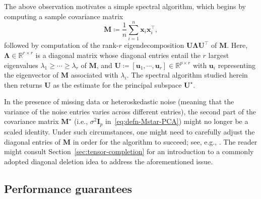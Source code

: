  The above observation motivates a simple spectral algorithm, which begins by computing a sample covariance matrix
%
\begin{equation}
	\bm{M} \coloneqq \frac{1}{n} \sum_{i=1}^{n}\bm{x}_{i}\bm{x}_{i}^{\top},
	\label{eq:defn-sample-covariance}
\end{equation}
%
followed by  computation of the rank-$r$ eigendecomposition $\bm{U}\bm{\Lambda}\bm{U}^{\top}$
of $\bm{M}$. Here, $\bm{\Lambda}\in\mathbb{R}^{r\times r}$ is a
diagonal matrix whose diagonal entries entail the $r$ largest eigenvalues $\lambda_{1}\geq\cdots\geq\lambda_{r}$
of $\bm{M}$, and $\bm{U}\coloneqq[\bm{u}_{1},\cdots,\bm{u}_{r}]\in\mathbb{R}^{p\times r}$
with $\bm{u}_{i}$ representing the eigenvector of $\bm{M}$ associated with $\lambda_{i}$.
The spectral algorithm studied herein then returns $\bm{U}$ as the  estimate for the principal subspace $\bm{U}^{\star}$.


\begin{remark}
	In the presence of missing data or heteroskedastic noise (meaning that the  variance of the noise entries varies across different entries),  the second part of the covariance matrix $\bm{M}^{\star}$ (i.e., $\sigma^{2}\bm{I}_{p}$ in~\eqref{eq:defn-Mstar-PCA}) might no longer be a scaled identity. Under such circumstances,
one might need to carefully adjust the diagonal entries of  $\bm{M}$ in order for the  algorithm to succeed; see, e.g., \citet{lounici2014high,loh2012high,zhang2018heteroskedastic,cai2019subspace,zhu2019high,yan2021inference}. The reader might  consult Section~\ref{sec:tensor-completion} for an introduction to a commonly adopted diagonal deletion idea to address the aforementioned issue.  
\end{remark}


\subsection{Performance guarantees}

